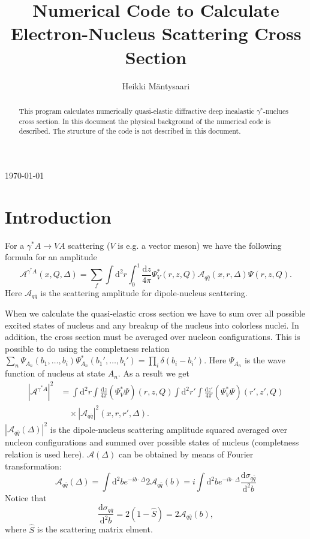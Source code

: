 \documentclass[a4paper,12pt]{article}
\title{Numerical Code to Calculate Electron-Nucleus Scattering Cross Section}
\author{Heikki Mäntysaari}
\date{}
\newcommand{\der}{\mathrm{d}}
\newcommand{\A}{\mathcal{A}}
\begin{document}
 
\maketitle
\begin{center}\today\end{center}
\begin{abstract}
This program calculates numerically quasi-elastic diffractive deep inealastic $\gamma^*$-nuclues cross section. In this document the physical background of the numerical code is described. The structure of the code is not described in this document.
\end{abstract}


\section{Introduction}
For a $\gamma^*A \rightarrow VA$ scattering ($V$ is e.g. a vector meson) we have the following formula for an amplitude \cite{Caldwell:2009ke}
\begin{equation}
	\A^{\gamma^* A}(x,Q,\Delta) =	\sum_f \int \der^2 r \int_0^1 \frac{\der z}{4\pi} \Psi_V^*(r,z,Q) \A_{q\bar q}(x,r,\Delta) \Psi(r,z,Q).
\end{equation}
Here $\A_{q\bar q}$ is the scattering amplitude for dipole-nucleus scattering. 

When we calculate the quasi-elastic cross section we have to sum over all possible excited states of nucleus and any breakup of the nucleus into colorless nuclei. In addition, the cross section must be averaged over nucleon configurations. This is possible to do using the completness relation $\sum_n \Psi_{A_n}(b_1,\dots,b_i) \Psi_{A_n}^*(b_1',\dots,b_i') = \prod_i \delta(b_i-b_i')$. Here $\Psi_{A_n}$ is the wave function of nucleus at state $A_n$. As a result we get
\begin{equation}
\begin{split}
	\label{eq:Asqr}
	|\A^{\gamma^* A}|^2 &= \int \der^2 r \int \frac{\der z}{4\pi} (\Psi_V^*\Psi)(r,z,Q) \int \der^2 r' \int \frac{\der z'}{4\pi} (\Psi_V^*\Psi)(r',z',Q) \\
	&\quad  \times |\A_{q\bar q}|^2(x,r,r',\Delta).
\end{split}
\end{equation}
$|\A_{q\bar q}(\Delta)|^2$ is the dipole-nucleus scattering amplitude squared averaged over nucleon configurations and summed over possible states of nucleus (completness relation is used here). $\A(\Delta)$ can be obtained by means of Fourier transformation:
\begin{equation}
	\A_{q\bar q}(\Delta) = \int \der^2 b e^{-ib\cdot \Delta} 2\A_{q\bar q}(b) = i\int \der^2 b e^{-ib\cdot \Delta} \frac{\der \sigma_{q\bar q}}{\der^2 b}
\end{equation}
Notice that
\begin{equation}
	\frac{\der \sigma_{q\bar q}}{\der^2 b} = 2(1-\hat S) = 2\A_{q\bar q}(b),
\end{equation}
where $\hat S$ is the scattering matrix elment. 
\end{document}
